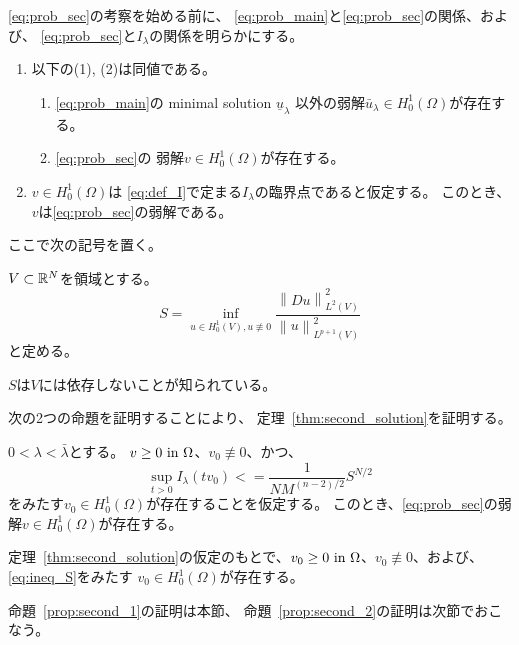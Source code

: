 \ref{eq:prob_sec}の考察を始める前に、
\ref{eq:prob_main}と\ref{eq:prob_sec}の関係、および、
\ref{eq:prob_sec}と$I_\lambda$の関係を明らかにする。

\begin{lem}
 \begin{enumerate}[1.]
  \item 以下の(1), (2)は同値である。
        \begin{enumerate}[(1)]
         \item \ref{eq:prob_main}の minimal solution $\underline{u}_\lambda$
               以外の弱解$\bar{u}_\lambda \in H_0^1(\Omega)$が存在する。
         \item \ref{eq:prob_sec}の
               弱解$v \in H_0^1(\Omega)$が存在する。
        \end{enumerate}
  \item $v \in H_0^1(\Omega)$は
        \eqref{eq:def_I}で定まる$I_\lambda$の臨界点であると仮定する。
        このとき、$v$は\ref{eq:prob_sec}の弱解である。
 \end{enumerate}
\end{lem}

ここで次の記号を置く。

\begin{nota} \label{nota:S_def}
 $V \subset \mathbb{R}^N$を領域とする。
 \begin{equation}
  S = \inf_{u \in H^1_0(V), u \not \equiv 0}
 \frac{\left\| Du \right\|_{L^2(V)}^2}{\left\| u
                                       \right\|_{L^{p+1}(V)}^2}  
 \label{eq:S_def}
 \end{equation}
 と定める。
\end{nota}

$S$は$V$には依存しないことが知られている。

次の2つの命題を証明することにより、
定理~\ref{thm:second_solution}を証明する。

\begin{prop} \label{prop:second_1}
 $0 < \lambda < \bar{\lambda}$とする。
 $v \geq 0 ~\text{in}~ \Omega$、$v_0 \not \equiv 0$、かつ、
 \begin{equation}
  \sup_{t > 0} I_\lambda (tv_0) < = \frac{1}{NM^{(n-2)/2}} S^{N/2} 
   \label{eq:ineq_S}
 \end{equation}
 をみたす$v_0 \in H_0^1(\Omega)$が存在することを仮定する。
 このとき、\ref{eq:prob_sec}の弱解$v \in H_0^1(\Omega)$が存在する。
\end{prop}

\begin{prop} \label{prop:second_2}
 定理~\ref{thm:second_solution}の仮定のもとで、$v_0 \geq 0 ~\text{in}~
 \Omega$、$v_0 \not \equiv 0$、および、\eqref{eq:ineq_S}をみたす
 $v_0 \in H_0^1(\Omega)$が存在する。
\end{prop}

命題~\ref{prop:second_1}の証明は本節、
命題~\ref{prop:second_2}の証明は次節でおこなう。